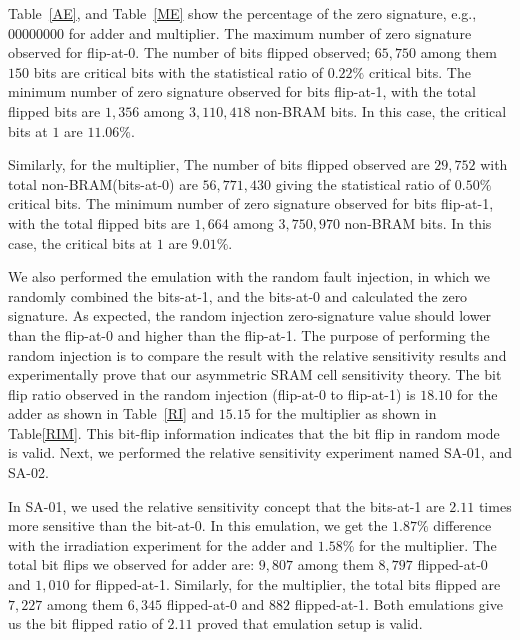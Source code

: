 Table~\ref{AE}, and Table~\ref{ME} show the percentage of the zero signature, e.g., $00000000$ for adder and multiplier. The maximum number of zero signature observed for flip-at-0. The number of bits flipped observed; $65,750$ among them $150$ bits are critical bits with the statistical ratio of $0.22\%$ critical bits. The minimum number of zero signature observed for bits flip-at-1, with the total flipped bits are $1,356$ among $3,110,418$ non-BRAM bits. In this case, the critical bits at $1$ are $11.06\%$. 

Similarly, for the multiplier,  The number of bits flipped observed are $29,752$ with total non-BRAM(bits-at-0) are $56,771,430$ giving the statistical ratio of $0.50\%$ critical bits. The minimum number of zero signature observed for bits flip-at-1, with the total flipped bits are $1,664$ among $3,750,970$ non-BRAM bits. In this case, the critical bits at $1$ are $9.01\%$.


We also performed the emulation with the random fault injection, in which we randomly combined the bits-at-1, and the bits-at-0 and calculated the zero signature. As expected, the random injection zero-signature value should lower than the flip-at-0 and higher than the flip-at-1. The purpose of performing the random injection is to compare the result with the relative sensitivity results and experimentally prove that our asymmetric SRAM cell sensitivity theory. The bit flip ratio observed in the random injection (flip-at-0 to flip-at-1) is $18.10$ for the adder as shown in Table~\ref{RI} and $15.15$ for the multiplier as shown in Table\ref{RIM}. This bit-flip information indicates that the bit flip in random mode is valid. Next, we performed the relative sensitivity experiment named SA-01, and SA-02.

In SA-01, we used the relative sensitivity concept that the  bits-at-1 are $2.11$ times more sensitive than the bit-at-0. In this emulation, we get the $1.87\%$ difference with the irradiation experiment for the adder and $1.58\%$ for the multiplier. The total bit flips we observed for adder are: $9,807$ among them $8,797$ flipped-at-0 and $1,010$ for flipped-at-1. Similarly, for the multiplier, the total bits flipped are $7,227$ among them $6,345$ flipped-at-0 and $882$ flipped-at-1. Both emulations give us the bit flipped ratio of $2.11$ proved that emulation setup is valid.


